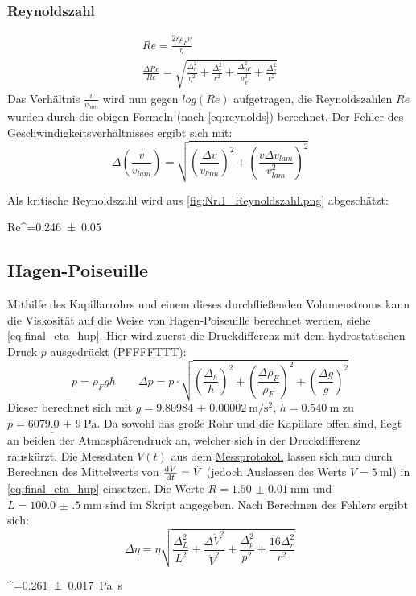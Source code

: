 \subsubsection*{Reynoldszahl}
\begin{gather}
    Re=\frac{2 r \rho_{F} v}{\eta}\\
    \frac{\Delta Re}{Re}=\sqrt{\frac{\Delta_{\eta}^{2}}{\eta^{2}} + \frac{\Delta_{r}^{2}}{r^{2}} + \frac{\Delta_{\rho F}^{2}}{\rho_{F}^{2}} + \frac{\Delta_{v}^{2}}{v^{2}}}
    \label{eq:Reynolds}
\end{gather}
Das Verhältnis \(\frac{v}{v_{lam}}\) wird nun gegen \(log(Re)\) aufgetragen, die Reynoldszahlen \(Re\) wurden durch die obigen Formeln (nach \cref{eq:reynolds}) berechnet. Der Fehler des Geschwindigkeitsverhältnisses ergibt sich mit:
\begin{equation}
    \Delta\left(\frac{v}{v_{lam}}\right)=\sqrt{\left(\frac{\Delta v}{v_{lam}}\right)^2+\left(\frac{v\Delta v_{lam}}{v_{lam}^2}\right)^2}
\end{equation}

Als kritische Reynoldszahl wird aus \cref{fig:Nr.1_Reynoldszahl.png} abgeschätzt:
\begin{rb}
    Re^=\num{0.246(50)}
\end{rb}

\FloatBarrier\subsection{Hagen-Poiseuille}
Mithilfe des Kapillarrohrs und einem dieses durchfließenden Volumenstroms kann die Viskosität auf die Weise von Hagen-Poiseuille berechnet werden, siehe \cref{eq:final_eta_hup}. Hier wird zuerst die Druckdifferenz mit dem hydrostatischen Druck \(p\) ausgedrückt (PFFFFTTT):
\begin{equation}
   p=\rho_{F}gh \qquad \Delta p=p\cdot\sqrt{\left(\frac{\Delta_h}{h}\right)^2+\left(\frac{\Delta\rho_F}{\rho_F}\right)^2+\left(\frac{\Delta g}{g}\right)^2}
\end{equation}
Dieser berechnet sich mit \(g=\qty{9.80984(2)}{\m\per\s\squared}\), \(h=\qty{0.540}{\m}\) zu \(\underline{p=\qty{6079.0(90)}{\pascal}}\). Da sowohl das große Rohr und die Kapillare offen sind, liegt an beiden der Atmosphärendruck an, welcher sich in der Druckdifferenz rauskürzt. 
Die Messdaten \(V(t)\) aus dem \hyperref[sec:Messprotokoll]{Messprotokoll} lassen sich nun durch Berechnen des Mittelwerts von \(\frac{\mathop{}\!\mathrm{d} V}{\mathop{}\!\mathrm{d} t}=\dot{V}\) (jedoch Auslassen des Werts \(V=\qty{5}{\milli\l}\)) in \cref{eq:final_eta_hup} einsetzen. Die Werte \(R=\qty{1.50(1)}{\milli\m}\) und \(L=\qty{100.0(5)}{\milli\m}\) sind im Skript angegeben. Nach Berechnen des Fehlers ergibt sich:
\begin{equation}
    \Delta \eta = \eta\sqrt{\frac{\Delta_{L}^{2}}{L^{2}} + \frac{\Delta \dot{V}^{2}}{\dot{V}^{2}} + \frac{\Delta_{p}^{2}}{p^{2}} + \frac{16 \Delta_{r}^{2}}{r^{2}}}
\end{equation}
\begin{rb}
    \eta^=\qty{0.261(17)}{\pascal\s}
\end{rb}
